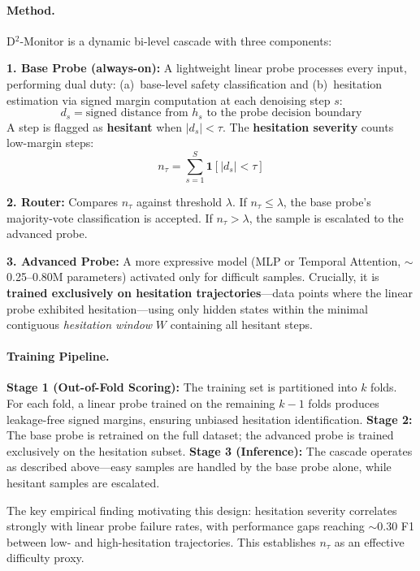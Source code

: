 \documentclass[11pt,a4paper]{article}
\begin{document}
\paragraph{Method.}
D$^2$-Monitor is a dynamic bi-level cascade with three components:

\textbf{1. Base Probe (always-on):} A lightweight linear probe processes every input, performing dual duty: (a)~base-level safety classification and (b)~hesitation estimation via signed margin computation at each denoising step $s$:
\begin{equation}
    d_s = \text{signed distance from } h_s \text{ to the probe decision boundary}
\end{equation}
A step is flagged as \textbf{hesitant} when $|d_s| < \tau$. The \textbf{hesitation severity} counts low-margin steps:
\begin{equation}
    n_\tau = \sum_{s=1}^{S} \mathbf{1}[|d_s| < \tau]
\end{equation}

\textbf{2. Router:} Compares $n_\tau$ against threshold $\lambda$. If $n_\tau \leq \lambda$, the base probe's majority-vote classification is accepted. If $n_\tau > \lambda$, the sample is escalated to the advanced probe.

\textbf{3. Advanced Probe:} A more expressive model (MLP or Temporal Attention, $\sim$0.25--0.80M parameters) activated only for difficult samples. Crucially, it is \textbf{trained exclusively on hesitation trajectories}---data points where the linear probe exhibited hesitation---using only hidden states within the minimal contiguous \emph{hesitation window} $W$ containing all hesitant steps.

\paragraph{Training Pipeline.}
\textbf{Stage 1 (Out-of-Fold Scoring):} The training set is partitioned into $k$ folds. For each fold, a linear probe trained on the remaining $k-1$ folds produces leakage-free signed margins, ensuring unbiased hesitation identification. \textbf{Stage 2:} The base probe is retrained on the full dataset; the advanced probe is trained exclusively on the hesitation subset. \textbf{Stage 3 (Inference):} The cascade operates as described above---easy samples are handled by the base probe alone, while hesitant samples are escalated.

The key empirical finding motivating this design: hesitation severity correlates strongly with linear probe failure rates, with performance gaps reaching $\sim$0.30 F1 between low- and high-hesitation trajectories. This establishes $n_\tau$ as an effective difficulty proxy.
\end{document}
